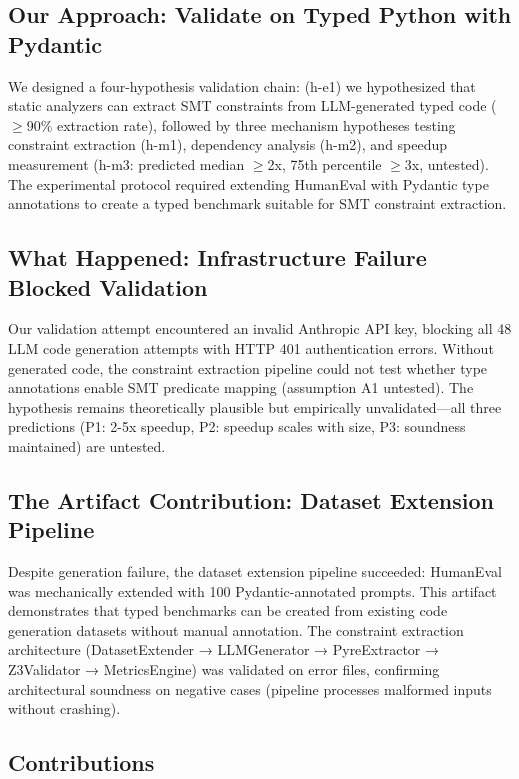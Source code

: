 \subsection{Our Approach: Validate on Typed Python with Pydantic}

We designed a four-hypothesis validation chain: (h-e1) we hypothesized that static analyzers can extract SMT constraints from LLM-generated typed code ($\geq$90\% extraction rate), followed by three mechanism hypotheses testing constraint extraction (h-m1), dependency analysis (h-m2), and speedup measurement (h-m3: predicted median $\geq$2x, 75th percentile $\geq$3x, untested). The experimental protocol required extending HumanEval with Pydantic type annotations to create a typed benchmark suitable for SMT constraint extraction.

\subsection{What Happened: Infrastructure Failure Blocked Validation}

Our validation attempt encountered an invalid Anthropic API key, blocking all 48 LLM code generation attempts with HTTP 401 authentication errors. Without generated code, the constraint extraction pipeline could not test whether type annotations enable SMT predicate mapping (assumption A1 untested). The hypothesis remains theoretically plausible but empirically unvalidated---all three predictions (P1: 2-5x speedup, P2: speedup scales with size, P3: soundness maintained) are untested.

\subsection{The Artifact Contribution: Dataset Extension Pipeline}

Despite generation failure, the dataset extension pipeline succeeded: HumanEval was mechanically extended with 100 Pydantic-annotated prompts. This artifact demonstrates that typed benchmarks can be created from existing code generation datasets without manual annotation. The constraint extraction architecture (DatasetExtender → LLMGenerator → PyreExtractor → Z3Validator → MetricsEngine) was validated on error files, confirming architectural soundness on negative cases (pipeline processes malformed inputs without crashing).

\subsection{Contributions}

